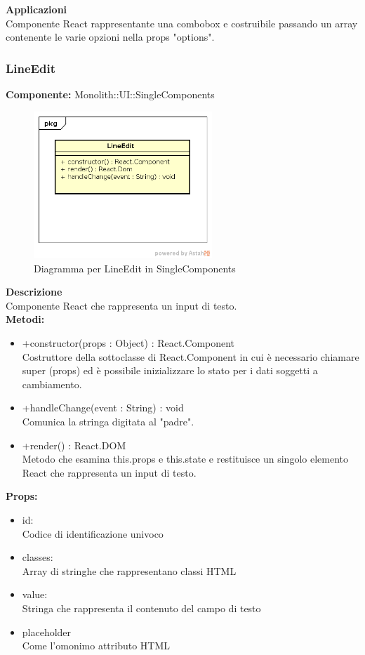 \textbf{Applicazioni}\\
Componente React rappresentante una combobox e costruibile passando un array contenente le varie opzioni nella props "options". 


\clearpage

\subsubsection{LineEdit}
\textbf{Componente:}  Monolith::UI::SingleComponents\\
   \FloatBarrier
   \begin{figure}[ht]
   \centering
   \includegraphics[width=0.6\textwidth]{img/single-LineEdit.png}
   \caption{{Diagramma per LineEdit in SingleComponents}}
\end{figure}
\FloatBarrier
\textbf{Descrizione}\\
Componente React che rappresenta un input di testo. \\
\textbf{Metodi:} 
\begin{itemize}
\item +constructor(props : Object) : React.Component 
\\
Costruttore della sottoclasse di React.Component in cui è necessario chiamare super (props) ed è possibile inizializzare lo stato per i dati soggetti a cambiamento.
\item +handleChange(event : String) : void  
\\
Comunica la stringa digitata al "padre". 
\item +render() : React.DOM 
\\
Metodo che esamina this.props e this.state e restituisce un singolo elemento React che rappresenta un input di testo.
\end{itemize}

\textbf{Props:} 
\begin{itemize}
\item id: 
\\
Codice di identificazione univoco
\item classes: 
\\
Array di stringhe che rappresentano classi HTML
\item value:
\\
Stringa che rappresenta il contenuto del campo di testo
\item placeholder
\\
Come l'omonimo attributo HTML

\end{itemize} 


